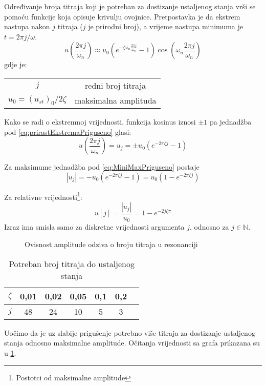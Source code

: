 Određivanje broja titraja koji je potreban za dostizanje ustaljenog stanja vrši
se pomoću funkcije koja opisuje krivulju ovojnice. Pretpostavka je da ekstrem
nastupa nakon $j$ titraja ($j$ je prirodni broj), a vrijeme nastupa minimuma je
$t=2\pi j/\omega$. 
\begin{equation}\label{eq:prirastEkstremaPriguseno}
    u\left(\frac{2\pi j}{\omega_n}\right) \approx
        u_0(e^{-\zeta\omega_n\frac{2\pi j}{\omega_n}}-1)\cos\left(\omega_n\frac{2\pi
        j}{\omega_n}\right)
\end{equation}
gdje je:
\begin{table}[H]
    \begin{tabular}{c c}
        $j$ & redni broj titraja\\
        $u_0=(u_{st})_0/2\zeta$ & maksimalna amplituda\\
    \end{tabular}
\end{table}
Kako se radi o ekstremnoj vrijednosti, funkcija kosinus iznosi $\pm 1$ pa jednadžba
pod \eqref{eq:prirastEkstremaPriguseno} glasi:
\begin{equation}\label{eq:MiniMaxPriguseno}
     u\left(\frac{2\pi j}{\omega_n}\right) = u_j = 
        \pm u_0(e^{-2\pi\zeta j}-1)
\end{equation}

Za maksimume jednadžba pod \eqref{eq:MiniMaxPriguseno} postaje
\begin{equation}
    |u_j| = -u_0(e^{-2\pi\zeta j} -1) = u_0(1-e^{-2\pi\zeta j})
\end{equation}

Za relativne vrijednosti\footnote{Postotci od maksimalne amplitude}:
\begin{equation}
    u[j] = \frac{|u_j|}{u_0}=1-e^{-2j\zeta\pi}
\end{equation}
Izraz ima smisla samo za diskretne vrijednosti argumenta $j$, odnosno za $j \in
\mathbb{N}$.

\par
\begin{figure}[H]
    
    \label{fig:prirast-rezonanca-priguseno}
    \caption{Ovisnost amplitude odziva o broju titraja u rezonanciji}
\end{figure}

\begin{table}[H]
    \caption{Potreban broj titraja do ustaljenog stanja}
    \label{table:prirast-rezonanca-priguseno}
    \begin{tabular}{|*{7}{c|}} %
        \hline
        $\zeta$ & 0,01 & 0,02 & 0,05 & 0,1 & 0,2\\
        \hline
        $j$ & 48 & 24 & 10 & 5 & 3\\
        \hline
    \end{tabular}
\end{table}

Uočimo da je uz slabije prigušenje potrebno više titraja za dostizanje ustaljenog
stanja odnosno maksimalne amplitude. Očitanja vrijednosti sa grafa prikazana su u
\ref{table:prirast-rezonanca-priguseno}.



